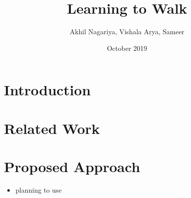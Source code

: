 \documentclass[a4paper,10pt]{article}
\title{Learning to Walk}
\author{Akhil Nagariya, Vishala Arya, Sameer}
\date{October 2019}
\begin{document}
\maketitle
  \section{Introduction}
  \section{Related Work}
  \section{Proposed Approach}
  \begin{itemize}
    \item planning to use \cite{DBLP:journals/corr/MontgomeryL16}
  \end{itemize}
  \cite{gps}
  \cite{vps}
  \cite{2014-cgps}
  \cite{DBLP:journals/corr/LevineFDA15}
  \cite{DBLP:journals/corr/MontgomeryL16}
  \cite{DBLP:journals/corr/GengZBCVSAL16}
   
  
\end{document}
